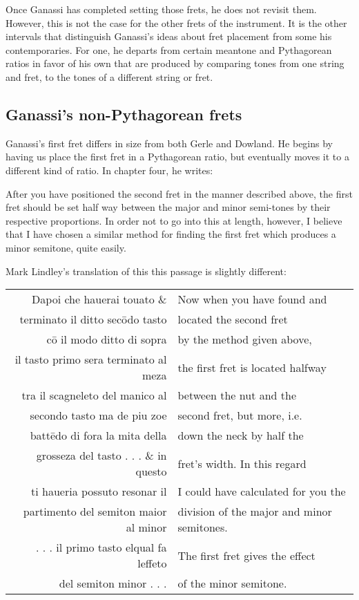 Once Ganassi has completed setting those frets, he does not revisit them.  However, this is not the case
for the other frets of the instrument.  It is the other intervals that
distinguish Ganassi's ideas about fret placement from some his contemporaries.  For one, he
departs from certain meantone and Pythagorean ratios in favor of his own that are produced by
comparing tones from one string and fret, to the tones of a different string or fret.

\subsection{Ganassi's non-Pythagorean frets}

Ganassi's first fret differs in size from both Gerle and Dowland.  He begins by
having us place the first fret in a Pythagorean ratio, but eventually moves it to
a different kind of ratio.  In chapter four, he writes:

\begin{blocks}
After you have positioned the second fret in the manner described above, the
first fret should be set half way between the major and minor semi-tones by
their respective proportions.  In order not to go into this at length, however,
I believe that I have chosen a similar method for finding the first fret which
produces a minor semitone, quite easily.\autocite[106]{RB:2}
\end{blocks}

Mark Lindley's translation of this this passage is slightly different:

\begin{blocks}
\begin{center}
\begin{tabular}{r l}
Dapoi che hauerai touato \&            & Now when you have found and \\
terminato il ditto sec\={o}do tasto    & located the second fret \\
c\={o} il modo ditto di sopra          & by the method given above, \\
il tasto primo sera terminato al meza  & the first fret is located halfway  \\
tra il scagneleto del manico al        & between the nut and the  \\
secondo tasto ma de piu zoe            & second fret, but more, i.e.  \\
batt\={e}do di fora la mita della      & down the neck by half the \\
grosseza del tasto . . . \& in questo  & fret's width.  In this regard \\
ti haueria possuto resonar il          & I could have calculated for you the \\
partimento del semiton maior al minor  & division of the major and minor semitones. \\
. . . il primo tasto elqual fa leffeto & The first fret gives the effect \\
del semiton minor . . .                & of the minor semitone. \\
\end{tabular}
\end{center}
\end{blocks}

